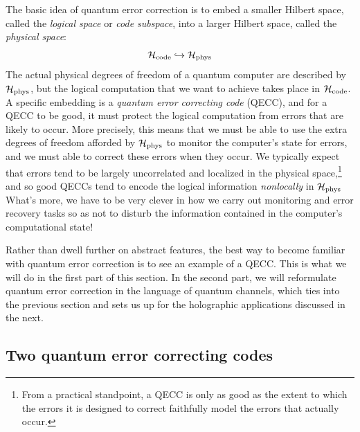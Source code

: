 \documentclass[a4paper,11pt]{article}
\newcommand{\Hil}{{\cal H}}
\newcommand{\mrm}[1]{\mathrm{#1}}
\begin{document}
The basic idea of quantum error correction is to embed a smaller Hilbert space, called the \emph{logical space} or \emph{code subspace}, into a larger Hilbert space, called the \emph{physical space}:
\begin{equation*}
\Hil_\mrm{code} \hookrightarrow \Hil_\mrm{phys}
\end{equation*}
The actual physical degrees of freedom of a quantum computer are described by $\Hil_\mrm{phys}$, but the logical computation that we want to achieve takes place in $\Hil_\mrm{code}$.
A specific embedding is a \emph{quantum error correcting code} (QECC), and for a QECC to be good, it must protect the logical computation from errors that are likely to occur.
More precisely, this means that we must be able to use the extra degrees of freedom afforded by $\Hil_\mrm{phys}$ to monitor the computer's state for errors, and we must able to correct these errors when they occur.
We typically expect that errors tend to be largely uncorrelated and localized in the physical space,\footnote{From a practical standpoint, a QECC is only as good as the extent to which the errors it is designed to correct faithfully model the errors that actually occur.} and so good QECCs tend to encode the logical information \emph{nonlocally} in $\Hil_\mrm{phys}$
What's more, we have to be very clever in how we carry out monitoring and error recovery tasks so as not to disturb the information contained in the computer's computational state!

Rather than dwell further on abstract features, the best way to become familiar with quantum error correction is to see an example of a QECC.
This is what we will do in the first part of this section.
In the second part, we will reformulate quantum error correction in the language of quantum channels, which ties into the previous section and sets us up for the holographic applications discussed in the next.


\subsection{Two quantum error correcting codes}
\end{document}
